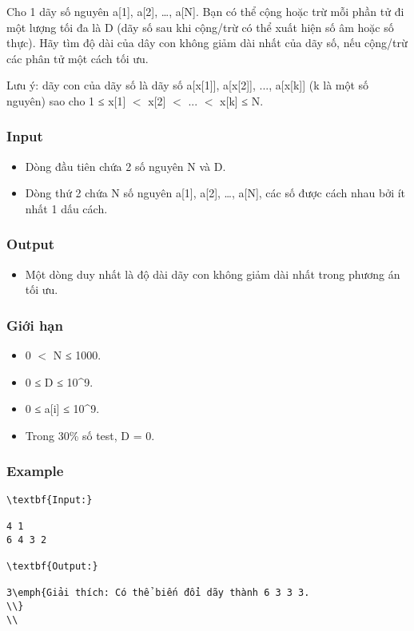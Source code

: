 



   Cho 1 dãy số nguyên a[1], a[2], …, a[N]. Bạn có thể cộng hoặc trừ mỗi phần tử đi một lượng tối đa là D (dãy số sau khi cộng/trừ có thể xuất hiện số âm hoặc số thực). Hãy tìm độ dài của dây con không giảm dài nhất của dãy số, nếu cộng/trừ các phân tử một cách tối ưu.  

Lưu ý: dãy con của dãy số là dãy số a[x[1]], a[x[2]], ..., a[x[k]] (k là một số nguyên) sao cho 1 ≤ x[1] $<$ x[2] $<$ ... $<$ x[k] ≤ N.

\subsubsection{   Input  }
\begin{itemize}
	\item     Dòng đầu tiên chứa 2 số nguyên N và D.   
	\item     Dòng thứ 2 chứa N số nguyên a[1], a[2], …, a[N], các số được cách nhau bởi ít nhất 1 dấu cách.   
\end{itemize}



\subsubsection{   Output  }
\begin{itemize}
	\item     Một dòng duy nhất là độ dài dãy con không giảm dài nhất trong phương án tối ưu.   
\end{itemize}

\subsubsection{   Giới hạn  }
\begin{itemize}
	\item     0 $<$ N ≤ 1000.   
	\item     0 ≤ D ≤ 10^9.   
	\item     0 ≤ a[i] ≤ 10^9.   
	\item     Trong 30\% số test, D = 0.   
\end{itemize}

\subsubsection{   Example  }
\begin{verbatim}
\textbf{Input:}

4 1
6 4 3 2

\textbf{Output:}

3\emph{Giải thích: Có thể biến đổi dãy thành 6 3 3 3.
\\}
\\\end{verbatim}
